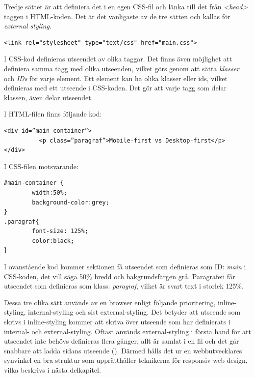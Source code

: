 \documentclass[11pt]{article}
\begin{document}
Tredje sättet är att definiera det i en egen CSS-fil och länka till det från \textit{<head>} taggen i HTML-koden. Det är det vanligaste av de tre sätten och kallas för \textit{external styling}.
\vspace{0.3cm}
\begin{verbatim}
<link rel="stylesheet" type="text/css" href="main.css">
\end{verbatim}
\vspace{0.3cm}

I CSS-kod definieras utseendet av olika taggar. Det finns även möjlighet att definiera samma tagg med olika utseenden, vilket görs genom att sätta \textit{klasser} och \textit{IDs} för varje element. Ett element kan ha olika klasser eller ids, vilket definieras med ett utseende i CSS-koden. Det gör att varje tagg som delar klassen, även delar utseendet.

\vspace{0.2cm}
I HTML-filen finns följande kod:

\begin{verbatim}
<div id=”main-container”>
          <p class=”paragraf”>Mobile-first vs Desktop-first</p>
</div>
\end{verbatim}
\vspace{0.2cm}
I CSS-filen motsvarande:

\begin{verbatim}
#main-container {
        width:50%;
        background-color:grey;
}
.paragraf{
        font-size: 125%;
        color:black;
}
\end{verbatim}
\vspace{0.5cm}

I ovanstående kod kommer sektionen få utseendet som definieras som ID: \textit{main} i CSS-koden, det vill säga 50\% bredd och bakgrundsfärgen grå. Paragrafen får utseendet som definieras som klass: \textit{paragraf}, vilket är svart text i storlek 125\%.

Dessa tre olika sätt används av en browser enligt följande prioritering, inline-styling, internal-styling och sist external-styling. Det betyder att utseende som skrivs i inline-styling kommer att skriva över utseende som har definierats i internal- och external-styling. Oftast används external-styling i första hand för att utseendet inte behövs definieras flera gånger, allt är samlat i en fil och det går snabbare att ladda sidans utseende (\cite{css}). Därmed hålls det ur en webbutvecklares synvinkel en bra struktur som upprätthåller teknikerna för responsiv web design, vilka beskrivs i nästa delkapitel.
\end{document}
